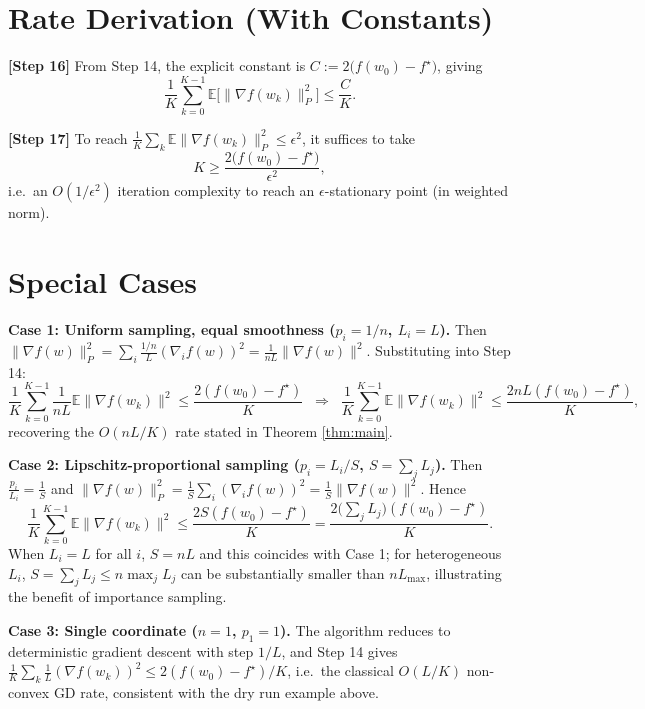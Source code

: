 \documentclass{article}
\begin{document}
\section*{Rate Derivation (With Constants)}

\textbf{[Step 16]} From Step 14, the explicit constant is
$C := 2\big(f(w_0) - f^\star\big)$, giving
\[
\frac{1}{K}\sum_{k=0}^{K-1} \mathbb{E}\big[\|\nabla f(w_k)\|_P^2\big] \le \frac{C}{K}.
\]

\textbf{[Step 17]} To reach $\frac1K\sum_k \mathbb{E}\|\nabla f(w_k)\|_P^2 \le \epsilon^2$,
it suffices to take
\[
K \ge \frac{2\big(f(w_0) - f^\star\big)}{\epsilon^2},
\]
i.e.\ an $O(1/\epsilon^2)$ iteration complexity to reach an
$\epsilon$-stationary point (in weighted norm).

\section*{Special Cases}

\textbf{Case 1: Uniform sampling, equal smoothness ($p_i = 1/n$, $L_i = L$).}
Then $\|\nabla f(w)\|_P^2 = \sum_i \frac{1/n}{L}(\nabla_i f(w))^2
= \frac{1}{nL}\|\nabla f(w)\|^2$. Substituting into Step 14:
\[
\frac{1}{K}\sum_{k=0}^{K-1} \frac{1}{nL}\mathbb{E}\|\nabla f(w_k)\|^2
\le \frac{2(f(w_0)-f^\star)}{K}
\;\;\Longrightarrow\;\;
\frac{1}{K}\sum_{k=0}^{K-1}\mathbb{E}\|\nabla f(w_k)\|^2
\le \frac{2nL(f(w_0)-f^\star)}{K},
\]
recovering the $O(nL/K)$ rate stated in Theorem \ref{thm:main}.

\textbf{Case 2: Lipschitz-proportional sampling ($p_i = L_i/S$, $S = \sum_j L_j$).}
Then $\frac{p_i}{L_i} = \frac{1}{S}$ and
$\|\nabla f(w)\|_P^2 = \frac{1}{S}\sum_i (\nabla_i f(w))^2 = \frac{1}{S}\|\nabla f(w)\|^2$.
Hence
\[
\frac{1}{K}\sum_{k=0}^{K-1}\mathbb{E}\|\nabla f(w_k)\|^2
\le \frac{2S(f(w_0)-f^\star)}{K}
= \frac{2\big(\sum_j L_j\big)(f(w_0)-f^\star)}{K}.
\]
When $L_i = L$ for all $i$, $S = nL$ and this coincides with Case 1; for
heterogeneous $L_i$, $S = \sum_j L_j \le n \max_j L_j$ can be substantially smaller
than $n L_{\max}$, illustrating the benefit of importance sampling.

\textbf{Case 3: Single coordinate ($n=1$, $p_1=1$).}
The algorithm reduces to deterministic gradient descent with step $1/L$, and
Step 14 gives $\frac1K\sum_k \frac{1}{L}(\nabla f(w_k))^2 \le 2(f(w_0)-f^\star)/K$,
i.e.\ the classical $O(L/K)$ non-convex GD rate, consistent with the dry run
example above.
\end{document}
